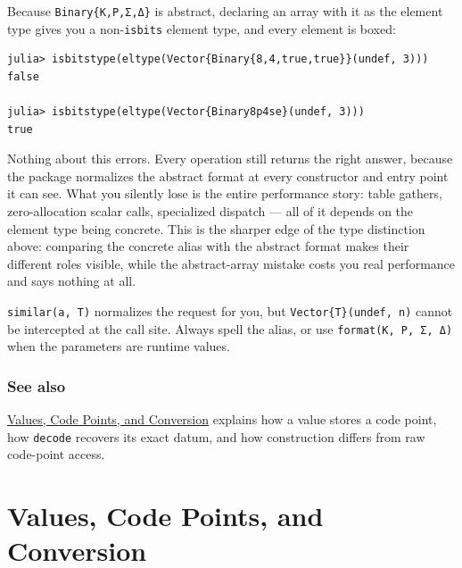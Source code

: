 \begin{tcolorbox}[toptitle=-1mm,bottomtitle=1mm,colback=admonition-default!50!white,colframe=admonition-default,title=\textbf{The abstract format as an array element type}]
Because \texttt{Binary\{K,P,Σ,Δ\}} is abstract, declaring an array with it as the element type gives you a non-\texttt{isbits} element type, and every element is boxed:


\nopagebreak[4]
\begin{verbatim}
julia> isbitstype(eltype(Vector{Binary{8,4,true,true}}(undef, 3)))
false

julia> isbitstype(eltype(Vector{Binary8p4se}(undef, 3)))
true
\end{verbatim}

Nothing about this errors. Every operation still returns the right answer, because the package normalizes the abstract format at every constructor and entry point it can see. What you silently lose is the entire performance story: table gathers, zero-allocation scalar calls, specialized dispatch — all of it depends on the element type being concrete. This is the sharper edge of the type distinction above: comparing the concrete alias with the abstract format makes their different roles visible, while the abstract-array mistake costs you real performance and says nothing at all.

\texttt{similar(a, T)} normalizes the request for you, but \texttt{Vector\{T\}(undef, n)} cannot be intercepted at the call site. Always spell the alias, or use \texttt{format(K, P, Σ, Δ)} when the parameters are runtime values.

\end{tcolorbox}


\subsection{See also}



\label{292862844209942199-dup3}{}


\href{concept\_\allowbreak{}values\_\allowbreak{}codepoints.md}{Values, Code Points, and Conversion} explains how a value stores a code point, how \texttt{decode} recovers its exact datum, and how construction differs from raw code-point access.



\chapter{Values, Code Points, and Conversion}


